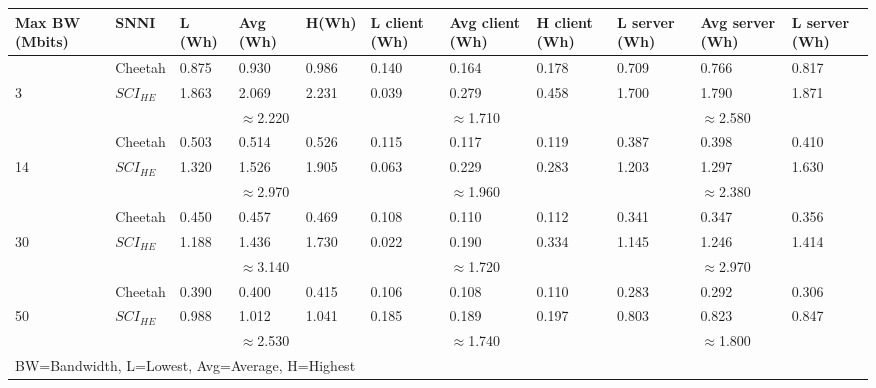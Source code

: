 \begin{tabular}{lllllllllll}
Max BW (Mbits) & SNNI    & L (Wh) & Avg (Wh) & H(Wh) & L client (Wh) & Avg client (Wh) & H client (Wh) & L server (Wh) & Avg server (Wh) & L server (Wh) \\ \hline
               & Cheetah & 0.875  & 0.930    & 0.986 & 0.140         & 0.164           & 0.178         & 0.709         & 0.766           & 0.817         \\
3              & $SCI_{HE}$ & 1.863  & 2.069    & 2.231 & 0.039         & 0.279           & 0.458         & 1.700         & 1.790           & 1.871         \\ \cline{3-11} 
               &         &        & $\approx$2.220    &       &               & $\approx$1.710           &               &               & $\approx$2.580           &               \\ \hline
               & Cheetah & 0.503  & 0.514    & 0.526 & 0.115         & 0.117           & 0.119         & 0.387         & 0.398           & 0.410         \\
14             & $SCI_{HE}$ & 1.320  & 1.526    & 1.905 & 0.063         & 0.229           & 0.283         & 1.203         & 1.297           & 1.630         \\ \cline{3-11} 
               &         &        & $\approx$2.970    &       &               & $\approx$1.960           &               &               & $\approx$2.380           &               \\ \hline
               & Cheetah & 0.450  & 0.457    & 0.469 & 0.108         & 0.110           & 0.112         & 0.341         & 0.347           & 0.356         \\
30             & $SCI_{HE}$ & 1.188  & 1.436    & 1.730 & 0.022         & 0.190           & 0.334         & 1.145         & 1.246           & 1.414         \\ \cline{3-11} 
               &         &        & $\approx$3.140    &       &               & $\approx$1.720           &               &               & $\approx$2.970           &               \\ \hline
               & Cheetah & 0.390  & 0.400    & 0.415 & 0.106         & 0.108           & 0.110         & 0.283         & 0.292           & 0.306         \\
50             & $SCI_{HE}$ & 0.988  & 1.012    & 1.041 & 0.185         & 0.189           & 0.197         & 0.803         & 0.823           & 0.847         \\ \cline{3-11} 
               &         &        & $\approx$2.530    &       &               & $\approx$1.740           &               &               & $\approx$1.800           &               \\ \hline
\multicolumn{11}{l}{BW=Bandwidth, L=Lowest, Avg=Average, H=Highest}                                                                                     
\end{tabular}